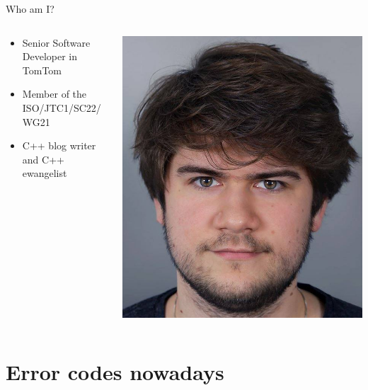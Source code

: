 \documentclass[10pt]{beamer}
\begin{document}
\begin{frame}{Who am I?}
	\begin{columns}[onlytextwidth]
		\begin{column}{0.7\textwidth}
			\begin{itemize}
				\item Senior Software Developer in TomTom
				\item Member of the ISO/JTC1/SC22/WG21
				\item C++ blog writer and C++ ewangelist
			\end{itemize}
		\end{column}
		\begin{column}{0.29\textwidth}
			\includegraphics[width=\linewidth]{Dawid_Pilarski.jpg}
		\end{column}	
	\end{columns}
\end{frame}


\section{Error codes nowadays}
\end{document}

